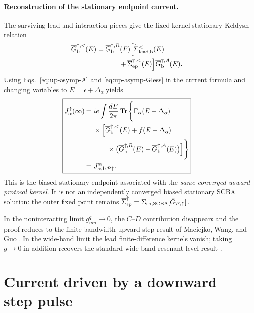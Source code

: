 \documentclass[
 reprint,
 superscriptaddress,
 amsmath,amssymb,
 aps,prb,
 longbibliography,
 floatfix
]{revtex4-2}
\newcommand{\ep}{\mathrm{ep}}
\newcommand{\barSigma}{\overline{\Sigma}}
\begin{document}
\paragraph{Reconstruction of the stationary endpoint current.}
The surviving lead and interaction pieces give the fixed-kernel stationary Keldysh relation
\begin{equation}
\begin{aligned}
\overline G_{\mathrm b}^{\uparrow,<}(E)
={}&
\overline G_{\mathrm b}^{\uparrow,R}(E)
\Big[
\widetilde\Sigma_{\rm lead,b}^{<}(E)
\\
&\qquad+
\barSigma_{\ep}^{\uparrow,<}(E)
\Big]
\overline G_{\mathrm b}^{\uparrow,A}(E).
\end{aligned}
\label{eq:up-asymp-Gless}
\end{equation}
Using Eqs.~\eqref{eq:up-asymp-A} and \eqref{eq:up-asymp-Gless} in the current formula and changing variables to $E=\epsilon+\Delta_\alpha$ yields
\begin{equation}
\boxed{
\begin{aligned}
J_\alpha^\uparrow(\infty)
={}&
 ie
\int\frac{dE}{2\pi}
\operatorname{Tr}\Bigg\{
\Gamma_\alpha(E-\Delta_\alpha)
\\
&\times\Big[
\overline G_{\mathrm b}^{\uparrow,<}(E)
+
f(E-\Delta_\alpha)
\\
&\qquad\times
\big(
\overline G_{\mathrm b}^{\uparrow,R}(E)
-
\overline G_{\mathrm b}^{\uparrow,A}(E)
\big)
\Big]\Bigg\}
\\
={}&
J_{\alpha,\mathrm b;\mathcal P\uparrow}^{\rm ss}.
\end{aligned}}
\label{eq:up-asymp-current-final}
\end{equation}
This is the biased stationary endpoint associated with the \emph{same converged upward protocol kernel}. It is not an independently converged biased stationary SCBA solution: the outer fixed point remains $\barSigma_{\ep}^{\uparrow}=\Sigma_{\ep,\rm SCBA}[\bar G_{\mathcal P,\uparrow}]$.

In the noninteracting limit $g_{mn}^q\to0$, the $C$--$D$ contribution disappears and the proof reduces to the finite-bandwidth upward-step result of Maciejko, Wang, and Guo \cite{MaciejkoWangGuo2006}. In the wide-band limit the lead finite-difference kernels vanish; taking $g\to0$ in addition recovers the standard wide-band resonant-level result \cite{WingreenJauhoMeir1993,JauhoWingreenMeir1994}.

\section{Current driven by a downward step pulse}
\label{sec:down}
\end{document}
